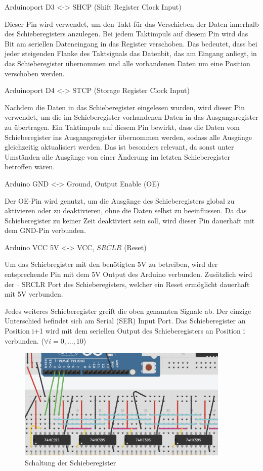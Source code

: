 Arduinoport D3 <-> SHCP (Shift Register Clock Input)

Dieser Pin wird verwendet, um den Takt für das Verschieben der Daten innerhalb des Schieberegisters anzulegen.
Bei jedem Taktimpuls auf diesem Pin wird das Bit am seriellen Dateneingang in das Register verschoben.
Das bedeutet, dass bei jeder steigenden Flanke des Taktsignals das Datenbit, das am Eingang anliegt, in das Schieberegister übernommen und alle vorhandenen Daten um eine Position verschoben werden.

Arduinoport D4 <-> STCP (Storage Register Clock Input)

Nachdem die Daten in das Schieberegister eingelesen wurden, wird dieser Pin verwendet, um die im Schieberegister vorhandenen Daten in das Ausgangsregister zu übertragen.
Ein Taktimpuls auf diesem Pin bewirkt, dass die Daten vom Schieberegister ins Ausgangsregister übernommen werden, sodass alle Ausgänge gleichzeitig aktualisiert werden.
Das ist besonders relevant, da sonst unter Umständen alle Ausgänge von einer Änderung im letzten Schieberegister betroffen wären.

Arduino GND <-> Ground, Output Enable (OE)

Der OE-Pin wird genutzt, um die Ausgänge des Schieberegisters global zu aktivieren oder zu deaktivieren, ohne die Daten selbst zu beeinflussen.
Da das Schieberegister zu keiner Zeit deaktiviert sein soll, wird dieser Pin dauerhaft mit dem GND-Pin verbunden.

Arduino VCC 5V <-> VCC, $\overline{SRCLR}$ (Reset)

Um das Schiebregister mit den benötigten 5V zu betreiben, wird der entsprechende Pin mit dem 5V Output des Arduino verbunden.
Zusätzlich wird der $\overline{ }$ SRCLR Port des Schieberegisters, welcher ein Reset ermöglicht dauerhaft mit 5V verbunden.

Jedes weiteres Schieberegister greift die oben genannten Signale ab.
Der einzige Unterschied befindet sich am Serial (SER) Input Port.
Das Schieberegister an Position i+1 wird mit dem seriellen Output des Schieberegisters an Position i verbunden. ($\forall i = 0,...,10$)

\begin{figure}[htbp]
	\centering
	\includegraphics[width=0.9\textwidth]{img/SchaltungSchieberegister}
	\caption{Schaltung der Schieberegister}
	\label{fig:Shifting}
\end{figure}

